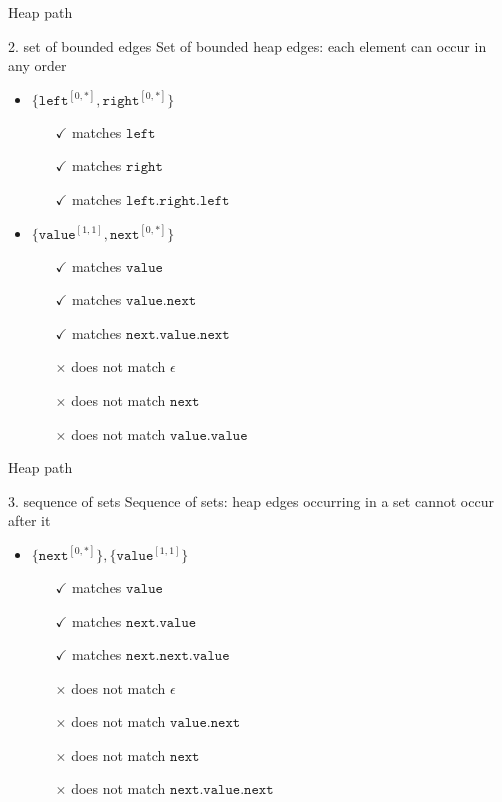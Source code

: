 \documentclass{beamer}
\begin{document}
\begin{frame}{Heap path}
\begin{block}{2. set of bounded edges}
Set of bounded heap edges: each element can occur in any order
\begin{itemize}
    \item<1-> $\{ \mathtt{left}^{[0,*]}, \mathtt{right}^{[0,*]} \}$ 
        \begin{itemize}
            \item[$\checkmark$] matches $\texttt{left}$
            \item[$\checkmark$] matches $\texttt{right}$
            \item[$\checkmark$] matches $\texttt{left.right.left}$
        \end{itemize}
    \item<2-> $\{ \mathtt{value}^{[1,1]}, \mathtt{next}^{[0,*]} \}$
        \begin{itemize}
        \item[$\checkmark$] matches $\mathtt{value}$
            \item[$\checkmark$] matches $\mathtt{value.next}$
            \item[$\checkmark$] matches $\mathtt{next.value.next}$
            \item[$\times$] does not match $\epsilon$
            \item[$\times$] does not match $\mathtt{next}$
            \item[$\times$] does not match $\mathtt{value.value}$
        \end{itemize}

\end{itemize}
\end{block}
\end{frame}
\begin{frame}{Heap path}
\begin{block}{3. sequence of sets}
Sequence of sets: heap edges occurring in a set cannot occur after it
\begin{itemize}
    \item<1-> $\{\mathtt{next}^{[0,*]}\}, \{ \mathtt{value}^{[1,1]} \}$
        \begin{itemize}
            \item[$\checkmark$] matches $\mathtt{value}$
            \item[$\checkmark$] matches $\mathtt{next.value}$
            \item[$\checkmark$] matches $\mathtt{next.next.value}$
            \item[$\times$] does not match $\epsilon$
            \item[$\times$] does not match $\mathtt{value.next}$
            \item[$\times$] does not match $\mathtt{next}$
            \item[$\times$] does not match $\mathtt{next.value.next}$
        \end{itemize}
\end{itemize}
\end{block}
\end{frame}
\end{document}
